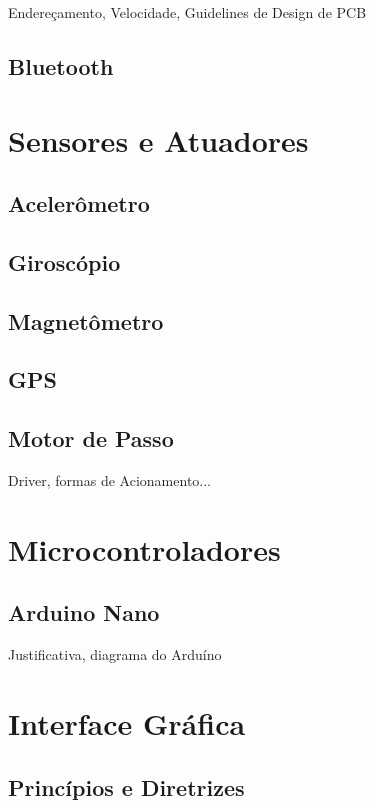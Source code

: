Endereçamento, Velocidade, Guidelines de Design de PCB

\subsection{Bluetooth}

\section{Sensores e Atuadores}

\subsection{Acelerômetro}
\subsection{Giroscópio}
\subsection{Magnetômetro}

\subsection{GPS}

\subsection{Motor de Passo}

Driver, formas de Acionamento...

\section{Microcontroladores}

\subsection{Arduino Nano}

Justificativa, diagrama do Arduíno

\section{Interface Gráfica}

\subsection{Princípios e Diretrizes}

